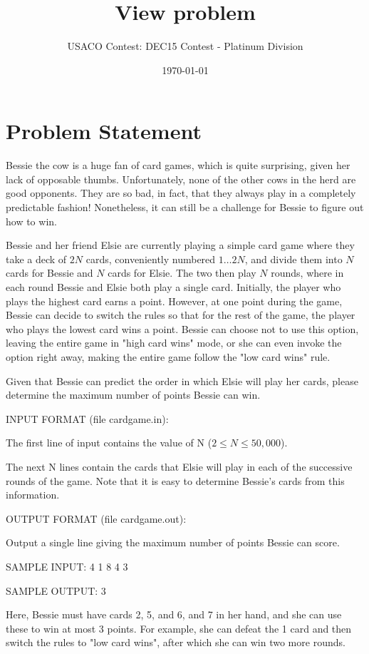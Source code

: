 \documentclass[12pt]{article}
\title{View problem}
\author{USACO Contest: DEC15 Contest - Platinum Division}
\date{\today}
\begin{document}
\maketitle

\section*{Problem Statement}

Bessie the cow is a huge fan of card games, which is quite surprising, given her
lack of opposable thumbs.  Unfortunately, none of the other cows in the herd are
good opponents.  They are so bad, in fact, that they always play in a completely
predictable fashion!  Nonetheless, it can still be a challenge for Bessie to
figure out how to win.

Bessie and her friend Elsie are currently playing a simple card game where they
take a deck of $2N$ cards, conveniently numbered $1 \ldots 2N$, and divide them
into $N$ cards for Bessie and $N$ cards for Elsie.   The two then play $N$
rounds, where in each round Bessie and Elsie both play a single card. 
Initially, the player who plays the highest card earns a point.  However, at one
point  during the game, Bessie can decide to switch the rules so that for the
rest of the game, the player who plays the lowest card wins a point.  Bessie can
choose not to use this option, leaving the entire game in "high card wins" mode,
or she can even invoke the option right away, making the entire game follow the
"low card wins" rule.

Given that Bessie can predict the order in which Elsie will play her cards,
please determine the maximum number of points Bessie can win.

INPUT FORMAT (file cardgame.in):

The first line of input contains the value of N ($2 \leq N \leq 50,000$).

The next N lines contain the cards that Elsie will play in each of the
successive rounds of the game.  Note that it is easy to determine Bessie's cards
from this information.


OUTPUT FORMAT (file cardgame.out):

Output a single line giving the maximum number of points Bessie can score.


SAMPLE INPUT:
4
1
8
4
3

SAMPLE OUTPUT: 
3

Here, Bessie must have cards 2, 5, and 6, and 7 in her hand, and she can use
these to win at most 3 points.  For example, she can defeat the 1 card and then
switch the rules to "low card wins", after which she can win two more rounds.
\end{document}

